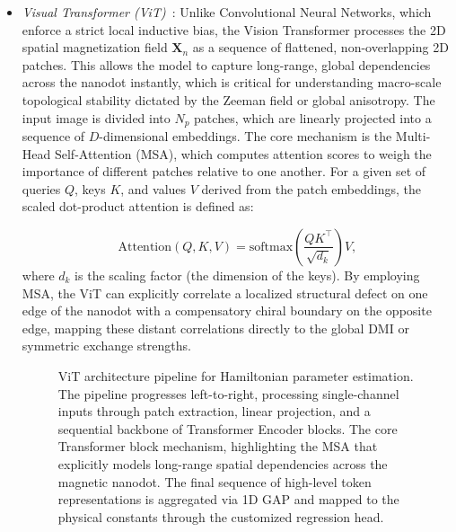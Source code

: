 \documentclass[a4paper,fleqn]{cas-sc}
\begin{document}
\begin{itemize}
\begin{figure}[pos=htbp]
    \centering
    \resizebox{0.85\linewidth}{!}{
    }
\caption{Xception architecture pipeline for Hamiltonian parameter estimation. The feature extractor composed of Entry, Middle, and Exit flows. A detailed horizontal view illustrates the depthwise separable convolution mechanism where spatial feature extraction (depthwise) and cross-channel correlations (pointwise) are entirely decoupled. The final aggregated features are mapped to physical constants.}\label{fig:xception_implementation}
\end{figure}



\item[--] \emph{Visual Transformer (ViT)}~\cite{dosovitskiy2020image}: Unlike Convolutional Neural Networks, which enforce a strict local inductive bias, the Vision Transformer processes the 2D spatial magnetization field $\mathbf{X}_n$ as a sequence of flattened, non-overlapping 2D patches. This allows the model to capture long-range, global dependencies across the nanodot instantly, which is critical for understanding macro-scale topological stability dictated by the Zeeman field or global anisotropy. The input image is divided into $N_p$ patches, which are linearly projected into a sequence of $D$-dimensional embeddings. The core mechanism is the Multi-Head Self-Attention (MSA), which computes attention scores to weigh the importance of different patches relative to one another. For a given set of queries $Q$, keys $K$, and values $V$ derived from the patch embeddings, the scaled dot-product attention is defined as:

\begin{equation}\label{eq:ViT}
\text{Attention}(Q, K, V) = \text{softmax}\left(\frac{QK^\top}{\sqrt{d_k}}\right)V,
\end{equation}
where $d_k$ is the scaling factor (the dimension of the keys). By employing MSA, the ViT can explicitly correlate a localized structural defect on one edge of the nanodot with a compensatory chiral boundary on the opposite edge, mapping these distant correlations directly to the global DMI or symmetric exchange strengths.

\begin{figure}[pos=htbp]
    \centering
    \resizebox{\linewidth}{!}{
    }
\caption{ViT architecture pipeline for Hamiltonian parameter estimation. The pipeline progresses left-to-right, processing single-channel inputs through patch extraction, linear projection, and a sequential backbone of Transformer Encoder blocks. The core Transformer block mechanism, highlighting the MSA that explicitly models long-range spatial dependencies across the magnetic nanodot. The final sequence of high-level token representations is aggregated via 1D GAP and mapped to the physical constants through the customized regression head.}
\label{fig:vit_implementation}
\end{figure}



\end{itemize}
\end{document}
